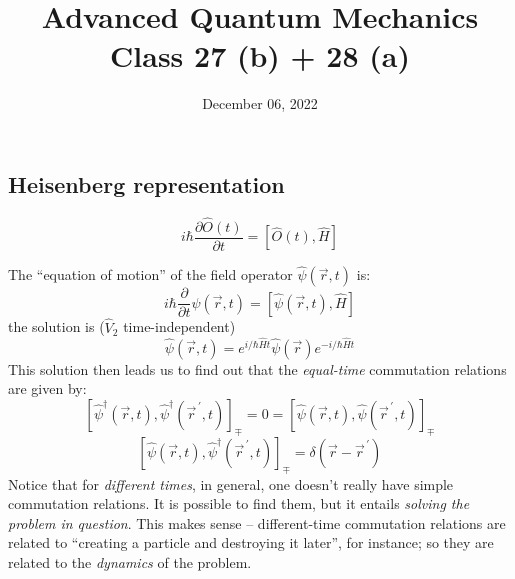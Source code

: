 \documentclass[12pt]{article}
\title{Advanced Quantum Mechanics\\Class 27 (b) + 28 (a)}
\date{December 06, 2022}                                           %
\newcommand{\be}{\begin{equation}}
\newcommand{\ee}{\end{equation}}
\newcommand{\vecrp}{\ensuremath{\vec{r}^{\,\prime}}}
\begin{document}
\maketitle

\setcounter{section}{9}
\setcounter{subsection}{5}


\subsection{Heisenberg representation}
\[
\boxed{
i \hbar \frac{\partial \hat{O}(t)}{\partial t}=[\hat{O}(t), \hat{H}]
}
\]

The ``equation of motion'' of the field operator $\hat{\psi}(\vec{r}, t)$ is:
\setcounter{equation}{88}
\be
i \hbar \frac{\partial}{\partial t} \hat{\psi}(\vec{r}, t)=[\hat{\psi}(\vec{r}, t), \hat{H}]
\ee
the solution is ($\hat{V}_2$ time-independent)
\be
\hat{\psi}(\vec{r}, t)=e^{i / \hbar \hat{H} t} \hat{\psi}(\vec{r}) e^{-i / \hbar \hat{H} t}
\ee
%
This solution then leads us to find out that the \emph{equal-time} commutation relations are given by:
\be
\left[\hat{\psi}^\dagger(\vec{r}, t), \hat{\psi}^\dagger(\vecrp, t)\right]_{\mp} = 0 =
\left[\hat{\psi}(\vec{r}, t), \hat{\psi}(\vecrp, t)\right]_{\mp}
\ee
\be
\left[\hat{\psi}(\vec{r}, t), \hat{\psi}^\dagger\left(\vecrp, t\right)\right]_{\mp}=\delta\left(\vec{r}-\vecrp\right)
\ee
Notice that for \emph{different times}, in general, 
one doesn't really have simple commutation relations.
It is possible to find them, but it entails
\emph{solving the problem in question}.
This makes sense -- different-time commutation relations are related to
``creating a particle and destroying it later'', for instance;
so they are related to the \emph{dynamics} of the problem.
\end{document}
